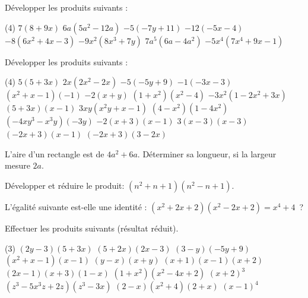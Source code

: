 \documentclass[a4paper,12pt]{report}
\begin{document}
\begin{exo}
Développer les produits suivants :
\begin{tasks}(4)
\task $7(8+9 x)$
\task $6 a\left(5 a^2-12 a\right)$
\task $-5(-7 y+11)$
\task $-12(-5 x-4)$
\task $-8\left(6 x^2+4 x-3\right)$
\task $-9 x^2\left(8 x^3+7 y\right)$
\task $7 a^5\left(6 a-4 a^2\right)$
\task $-5 x^4\left(7 x^4+9 x-1\right)$
\end{tasks}
\end{exo}
\begin{exo}
Développer les produits suivants :
\begin{tasks}(4)
\task $5(5+3 x)$
\task $2 x\left(2 x^2-2 x\right)$
\task $-5(-5 y+9)$
\task $-1(-3 x-3)$
\task $\left(x^2+x-1\right)(-1)$
\task $-2(x+y)$
\task $\left(1+x^2\right)\left(x^2-4\right)$
\task $-3 x^2\left(1-2 x^2+3 x\right)$
\task $(5+3 x)(x-1)$
\task $3 x y\left(x^2 y+x-1\right)$
\task $\left(4-x^2\right)\left(1-4 x^2\right)$
\task $\left(-4 x y^3-x^3 y\right)(-3 y)$
\task $-2(x+3)(x-1)$
\task $3(x-3)(x-3)$
\task $(-2 x+3)(x-1)$
\task $(-2 x+3)(3-2 x)$
\end{tasks}
\end{exo}
\begin{exo}
L'aire d'un rectangle est de $4 a^2+6 a$. Déterminer sa longueur, si la largeur mesure $2 a$.
\end{exo}
\begin{exo}
Développer et réduire le produit: $\left(n^2+n+1\right)\left(n^2-n+1\right)$. 
\begin{comment}
$\left(^*\right)$ Déterminer toutes les valeurs de l'entier naturel $n$, pour lesquelles $n^4+n^2+1$ est un nombre premier.
\end{comment}
\end{exo}
\begin{exo}
L'égalité suivante est-elle une identité : $\left(x^2+2 x+2\right)\left(x^2-2 x+2\right)=x^4+4$~?
\end{exo}

\begin{comment}
\begin{exo}
(*) Si $10 a+b$ est un multiple de $7, a-2 b$ est-il multiple de 7~?
\end{exo}
\end{comment}
\begin{exo}
Effectuer les produits suivants (résultat réduit).
\begin{tasks}(3)
\task $(2 y-3)(5+3 x)$
\task $(5+2 x)(2 x-3)$
\task $(3-y)(-5 y+9)$
\task $\left(x^2+x-1\right)(x-1)$
\task $(y-x)(x+y)$
\task $(x+1)(x-1)(x+2)$
\task $(2 x-1)(x+3)(1-x)$
\task $\left(1+x^2\right)\left(x^2-4 x+2\right)$
\task $(x+2)^3$
\task $\left(z^3-5 x^3 z+2 z\right)\left(z^3-3 x\right)$
\task $(2-x)\left(x^2+4\right)(2+x)$
\task $(x-1)^4$
\end{tasks}
\end{exo}
\end{document}
